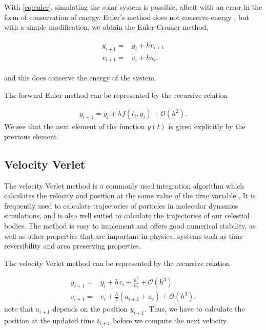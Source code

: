 \documentclass[../main.tex]{subfiles}
\begin{document}
With \cref{eq:euler}, simulating the solar system is possible, albeit with an error in the form of conservation of energy. Euler's method does not conserve energy \cite{}, but with a simple modification, we obtain the Euler-Cromer method,

\begin{align}
    \begin{split}
        y_{i+1} = & y_i + h v_{i+1}\\
        v_{i+1} = & v_i + h a_i,
    \end{split}
    \label{eq:euler-cromer}
\end{align}

and this does conserve the energy of the system. 


The forward Euler method can be represented by the recursive relation

\begin{align}
    y_{i+1}=y_i+hf(t_i,y_i)+\mathcal{O}(h^2).
\end{align} We see that the next element of the function \ensuremath{y(t)} is given explicitly by the previous element.  

\iffalse
\begin{algorithm}[H]
\SetAlgoLined
 
 \caption{Forward Euler}
\end{algorithm}
\fi

\subsection{Velocity Verlet}
The velocity Verlet method is a commonly used integration algorithm which calculates the velocity and position at the same value of the time variable \cite{Verlet1967}. It  is  frequently  used  to  calculate  trajectories  of  particles  in  molecular  dynamics  simulations, and is also well suited to calculate the trajectories of our celestial bodies.  The method is easy to implement and offers good numerical stability, as well as other properties that are important in physical systems such as time-reversibility and area preserving properties. 

The velocity Verlet method can be represented by the recursive relation

\begin{align}
    y_{i+1} = & y_i+hv_i+\frac{h^2}{a_i}+\mathcal{O}(h^3) \\
    v_{i+1} = & v_i+\frac{h}{2}(a_{i+1}+a_i)+\mathcal{O}(h^3).
\end{align} note that \ensuremath{a_{i+1}} depends on the position \ensuremath{y_{i+1}}. Thus, we have to calculate the position at the updated time \ensuremath{t_{i+1}} before we compute the next velocity. 
\end{document}
